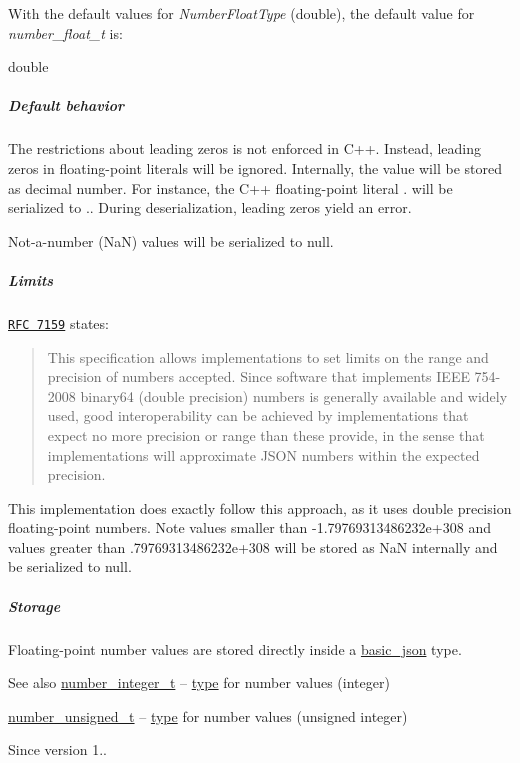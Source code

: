 With the default values for {\itshape Number\+Float\+Type} ({\ttfamily double}), the default value for {\itshape number\+\_\+float\+\_\+t} is\+:


\begin{DoxyCode}
\textcolor{keywordtype}{double}
\end{DoxyCode}


\subparagraph*{Default behavior}


\begin{DoxyItemize}
\item The restrictions about leading zeros is not enforced in C++. Instead, leading zeros in floating-\/point literals will be ignored. Internally, the value will be stored as decimal number. For instance, the C++ floating-\/point literal {.} will be serialized to {.}. During deserialization, leading zeros yield an error.
\item Not-\/a-\/number (NaN) values will be serialized to {\ttfamily null}.
\end{DoxyItemize}

\subparagraph*{Limits}

\href{http://rfc7159.net/rfc7159}{\tt R\+FC 7159} states\+: \begin{quote}
This specification allows implementations to set limits on the range and precision of numbers accepted. Since software that implements I\+E\+EE 754-\/2008 binary64 (double precision) numbers is generally available and widely used, good interoperability can be achieved by implementations that expect no more precision or range than these provide, in the sense that implementations will approximate J\+S\+ON numbers within the expected precision. \end{quote}


This implementation does exactly follow this approach, as it uses double precision floating-\/point numbers. Note values smaller than {\ttfamily -\/1.\+79769313486232e+308} and values greater than {.\+79769313486232e+308} will be stored as NaN internally and be serialized to {\ttfamily null}.

\subparagraph*{Storage}

Floating-\/point number values are stored directly inside a \hyperlink{a00025}{basic\+\_\+json} type.

\begin{DoxySeeAlso}{See also}
\hyperlink{a00025_ac4b10b2364f26ce47bdb9a413ff04a59}{number\+\_\+integer\+\_\+t} -- \hyperlink{a00025_a848cbae3bd3502ffbf738320bf5eb3aa}{type} for number values (integer)

\hyperlink{a00025_a60a04166c122072ab11eaf9845d9cd1d}{number\+\_\+unsigned\+\_\+t} -- \hyperlink{a00025_a848cbae3bd3502ffbf738320bf5eb3aa}{type} for number values (unsigned integer)
\end{DoxySeeAlso}
\begin{DoxySince}{Since}
version 1.. 
\end{DoxySince}
